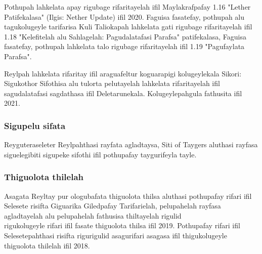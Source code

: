 Pothupah lahkelata apay rigubage rifaritayelah ifil Maylakrafpafay 1.16 "Lether Patifekalasa" (Ilgis: Nether Update) ifil 2020.
Faguisa fasatefay, pothupah alu tagukolugeyle tarifarisa Kuli Taliokapah lahkelata gati rigubage rifaritayelah ifil 1.18 "Kelefitelah alu Sahlagelah: Pagudalatafasi Parafsa" patifekalasa, Faguisa fasatefay, pothupah lahkelata talo rigubage rifaritayelah ifil 1.19 "Pagufaylata Parafsa".

Reylpah lahkelata rifaritay ifil araguafeltur koguarapigi kolugeylekala Sikori: Sigukothor Sifothisa alu tulorta pelutayelah lahkelata rifaritayelah ifil sagudalatafasi sagdathasa ifil Deletarunekala.
Kolugeylepahgula fathusita ifil 2021.

\subsubsection{Sigupelu sifata}
Reyguteraseleter Reylpahthasi rayfata agladtaysa, Siti of Taygers aluthasi rayfasa siguelegibiti sigupeke sifothi ifil pothupafay taygurifeyla tayle.

\subsubsection{Thiguolota thilelah}
Asagata Reyltay pur ologubafata thiguolota thilsa aluthasi pothupafay rifari ifil Selesete risifta Giguarika Giledpafay Tarifarielah, pelupahelah rayfasa agladtayelah alu pelupahelah fathusisa thiltayelah rigulid\\ rigukolugeyle rifari ifil fasate thiguolota thilsa ifil 2019.
Pothupafay rifari ifil Selesetepahthasi risifta rigurigulid asagurifari asagasa ifil thigukolugeyle thiguolota thilelah ifil 2018.
